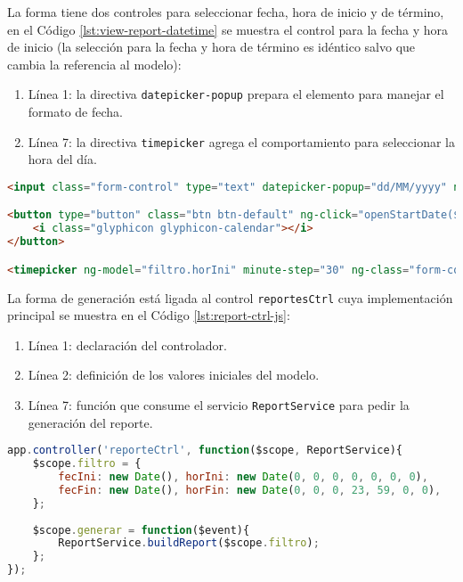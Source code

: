 La forma tiene dos controles para seleccionar fecha, hora de inicio y de término, en el Código \ref{lst:view-report-datetime} se muestra el control para la fecha y hora de inicio (la selección para la fecha y hora de término es idéntico salvo que cambia la referencia al modelo):
\begin{enumerate}
	\item Línea 1: la directiva \texttt{datepicker-popup} prepara el elemento para manejar el formato de fecha.
	\item Línea 7: la directiva \texttt{timepicker} agrega el comportamiento para seleccionar la hora del día.
\end{enumerate}
\begin{lstlisting}[language=HTML, captionpos=b, caption={Controles para seleccionar fecha y hora en la generación de reportes.}, label={lst:view-report-datetime}]
<input class="form-control" type="text" datepicker-popup="dd/MM/yyyy" ng-model="filtro.fecIni" is-open="startDateOpen" ng-required="true" starting-day="1" />

<button type="button" class="btn btn-default" ng-click="openStartDate($event)">
	<i class="glyphicon glyphicon-calendar"></i>
</button>

<timepicker ng-model="filtro.horIni" minute-step="30" ng-class="form-control"></timepicker>
\end{lstlisting}

La forma de generación está ligada al control \texttt{reportesCtrl} cuya implementación principal se muestra en el Código \ref{lst:report-ctrl-js}:

\begin{enumerate}
	\item Línea 1: declaración del controlador.
	\item Línea 2: definición de los valores iniciales del modelo.
	\item Línea 7: función que consume el servicio \texttt{ReportService} para pedir la generación del reporte.
\end{enumerate}

\begin{lstlisting}[language=Javascript, caption={Servicio en \textit{AngularJS} para pedir la generación de un reporte.}, captionpos=b, label={lst:report-ctrl-js}]
app.controller('reporteCtrl', function($scope, ReportService){
	$scope.filtro = {
		fecIni: new Date(), horIni: new Date(0, 0, 0, 0, 0, 0, 0),
		fecFin: new Date(), horFin: new Date(0, 0, 0, 23, 59, 0, 0),
	};
	
	$scope.generar = function($event){
		ReportService.buildReport($scope.filtro);
	};
});
\end{lstlisting}

